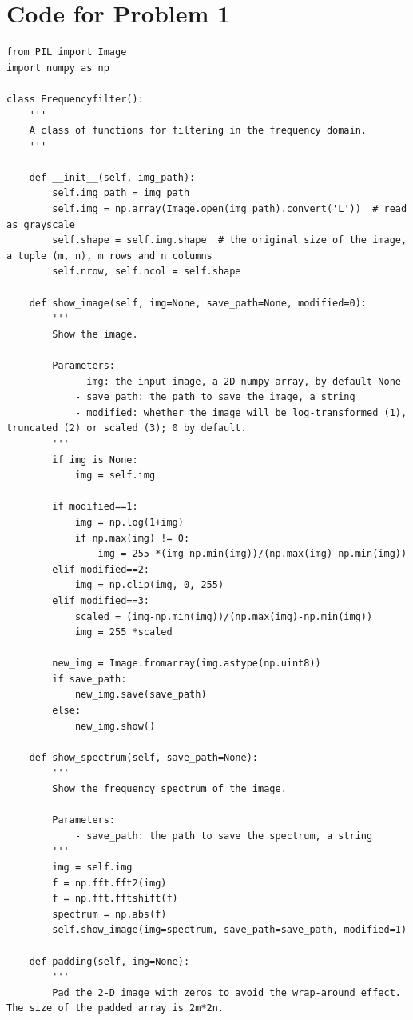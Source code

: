 \documentclass[UTF8]{ctexart}
\begin{document}
\newpage
\appendix
\hypertarget{code1}{\section{Code for Problem 1}}
\begin{lstlisting}
from PIL import Image
import numpy as np

class Frequencyfilter():
    '''
    A class of functions for filtering in the frequency domain.
    '''
    
    def __init__(self, img_path):
        self.img_path = img_path
        self.img = np.array(Image.open(img_path).convert('L'))  # read as grayscale  
        self.shape = self.img.shape  # the original size of the image, a tuple (m, n), m rows and n columns
        self.nrow, self.ncol = self.shape
    
    def show_image(self, img=None, save_path=None, modified=0):
        '''
        Show the image.
        
        Parameters:
            - img: the input image, a 2D numpy array, by default None
            - save_path: the path to save the image, a string
            - modified: whether the image will be log-transformed (1), truncated (2) or scaled (3); 0 by default.
        '''
        if img is None:
            img = self.img

        if modified==1:
            img = np.log(1+img)
            if np.max(img) != 0:
                img = 255 *(img-np.min(img))/(np.max(img)-np.min(img))
        elif modified==2:
            img = np.clip(img, 0, 255)
        elif modified==3:
            scaled = (img-np.min(img))/(np.max(img)-np.min(img))
            img = 255 *scaled
        
        new_img = Image.fromarray(img.astype(np.uint8))
        if save_path:
            new_img.save(save_path)
        else:
            new_img.show()
    
    def show_spectrum(self, save_path=None):
        '''
        Show the frequency spectrum of the image.
        
        Parameters:
            - save_path: the path to save the spectrum, a string
        '''
        img = self.img
        f = np.fft.fft2(img)
        f = np.fft.fftshift(f)
        spectrum = np.abs(f)
        self.show_image(img=spectrum, save_path=save_path, modified=1)
    
    def padding(self, img=None):
        '''
        Pad the 2-D image with zeros to avoid the wrap-around effect. The size of the padded array is 2m*2n.
        

\end{lstlisting}
\end{document}
